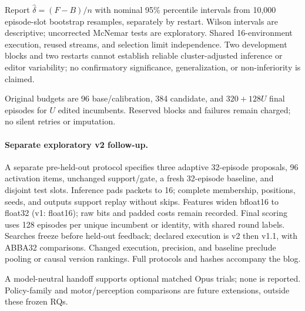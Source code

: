 Report $\widehat\delta=(F-B)/n$ with nominal 95\% percentile intervals from 10,000 episode-slot bootstrap resamples, separately by restart. Wilson intervals are descriptive; uncorrected McNemar tests are exploratory. Shared 16-environment execution, reused streams, and selection limit independence. Two development blocks and two restarts cannot establish reliable cluster-adjusted inference or editor variability; no confirmatory significance, generalization, or non-inferiority is claimed.

Original budgets are 96 base/calibration, 384 candidate, and $320+128U$ final episodes for $U$ edited incumbents. Reserved blocks and failures remain charged; no silent retries or imputation.

\paragraph{Separate exploratory v2 follow-up.}
A separate pre-held-out protocol specifies three adaptive 32-episode proposals, 96 activation items, unchanged support/gate, a fresh 32-episode baseline, and disjoint test slots. Inference pads packets to 16; complete membership, positions, seeds, and outputs support replay without skips. Features widen bfloat16 to float32 (v1: float16); raw bits and padded costs remain recorded. Final scoring uses 128 episodes per unique incumbent or identity, with shared round labels. Searches freeze before held-out feedback; declared execution is v2 then v1.1, with ABBA32 comparisons. Changed execution, precision, and baseline preclude pooling or causal version rankings. Full protocols and hashes accompany the blog.

A model-neutral handoff supports optional matched Opus trials; none is reported. Policy-family and motor/perception comparisons are future extensions, outside these frozen RQs.
